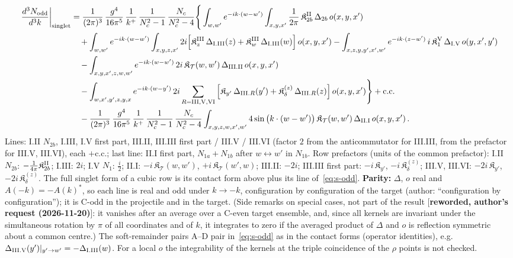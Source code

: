 \documentclass[9pt]{article}
\numberwithin{equation}{section}
\begin{document}
{\begin{align}
\frac{d^{3}N_{\rm odd}}{d^{3}k}\bigg|_{\rm singlet}&=\frac{1}{(2\pi)^{3}}\,\frac{g^{4}}{16\pi^{5}}\,\frac{1}{k^{+}}\,\frac{1}{N_{c}^{2}-1}\,\frac{N_{c}}{N_{c}^{2}-4}\Bigg\{\int_{w,w'}e^{-ik\cdot(w-w')}\int_{x,y,x'}\frac{1}{2\pi}\,\mathfrak{K}^{\rm II}_{2b}\,\Delta_{2b}\,o(x,y,x')\notag\\
&\quad+\int_{w,w'}e^{-ik\cdot(w-w')}\int_{x,y,z,x'}2i\Big[\mathfrak{K}^{\rm III}_{z}\,\Delta_{\rm I.III}(z)+\mathfrak{K}^{\rm III}_{w}\,\Delta_{\rm I.III}(w)\Big]\,o(x,y,x')
-\int_{x,z,y,y',x',w'}e^{-ik\cdot(z-w')}\,i\,\mathfrak{K}^{\rm V}_{1}\,\Delta_{\rm I.V}\,o(y,x',y')\notag\\
&\quad-\int_{x,y,x',z,w,w'}e^{-ik\cdot(w-w')}\,2i\,\mathfrak{K}_{\mathcal{T}}(w,w')\,\Delta_{\rm III.II}\,o(x,y,x')\notag\\
&\quad-\int_{w,x',y',z,y,x}e^{-ik\cdot(w-y')}\,2i\sum_{R={\rm III,V,VI}}\Big[\mathfrak{K}_{y'}\,\Delta_{{\rm III}.R}(y')+\mathfrak{K}^{(z)}_{\delta}\,\Delta_{{\rm III}.R}(z)\Big]\,o(x,y,x')\Bigg\}+{\rm c.c.}\notag\\
&\quad-\frac{1}{(2\pi)^{3}}\,\frac{g^{4}}{16\pi^{5}}\,\frac{1}{k^{+}}\,\frac{1}{N_{c}^{2}-1}\,\frac{N_{c}}{N_{c}^{2}-4}\int_{x,y,z,w,x',w'}4\sin\big(k\cdot(w-w')\big)\,\mathfrak{K}_{\mathcal{T}}(w,w')\,\Delta_{\rm II.I}\,o(x,y,x')\,.\label{eq:s-odd}
\end{align}
Lines: I.II $N_{2b}$, I.III, I.V first part, III.II, III.III first part / III.V / III.VI (factor $2$ from the anticommutator for III.III, from the prefactor for III.V, III.VI), each $+$c.c.; last line: II.I first part, $N_{1a}+N_{1b}$ after $w\leftrightarrow w'$ in $N_{1b}$. Row prefactors (units of the common prefactor): I.II $N_{2b}$: $-\frac{1}{4\pi}\mathfrak{K}^{\rm II}_{2b}$; I.III: $2i$; I.V $N_{1}$: $\frac{i}{2}$; II.I: $-i\,\mathfrak{K}_{\mathcal{T}}(w,w')$, $+i\,\mathfrak{K}_{\mathcal{T}}(w',w)$; III.II: $-2i$; III.III first part: $-i\,\mathfrak{K}_{y'}$, $-i\,\mathfrak{K}^{(z)}_{\delta}$; III.V, III.VI: $-2i\,\mathfrak{K}_{y'}$, $-2i\,\mathfrak{K}^{(z)}_{\delta}$. The full singlet form of a cubic row is its contact form above plus its line of~\eqref{eq:s-odd}. \textbf{Parity:} $\Delta$, $o$ real and $A(-k)=-A(k)^{*}$, so each line is real and odd under $k\to-k$, configuration by configuration of the target (author: ``configuration by configuration''); it is C-odd in the projectile and in the target. (Side remarks on special cases, not part of the result [\textbf{reworded, author's request (2026-11-20)}]: it vanishes after an average over a C-even target ensemble, and, since all kernels are invariant under the simultaneous rotation by $\pi$ of all coordinates and of $k$, it integrates to zero if the averaged product of $\Delta$ and $o$ is reflection symmetric about a common centre.) The soft-remainder pairs A--D pair in~\eqref{eq:s-odd} as in the contact forms (operator identities), e.g.\ $\Delta_{\rm III.V}(y')|_{y'\to w'}=-\Delta_{\rm I.III}(w)$. For a local $o$ the integrability of the kernels at the triple coincidence of the $\rho$ points is not checked.

}
\end{document}
